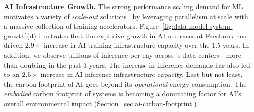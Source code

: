 \textbf{AI Infrastructure Growth.}
The strong performance scaling demand for ML motivates a variety of \textit{scale-out} solutions~\cite{Mudigere:scaling-training:2021,Rajbhandari:zero:2021} by leveraging parallelism at scale with a massive collection of training accelerators.
Figure~\ref{fig:data-model-system-growth}(d) illustrates that the explosive growth in AI use cases at Facebook has driven $2.9\times$ increase in AI training infrastructure capacity over the 1.5 years.
In addition, we observe trillions of inference per day across \fb's data centers---more than doubling in the past 3 years. 
The increase in inference demands has also led to an $2.5\times$ increase in AI inference infrastructure capacity. 
Last but not least, the carbon footprint of AI goes beyond its \textit{operational} energy consumption. 
The \textit{embodied} carbon footprint of systems is becoming a dominating factor for AI's overall environmental impact (Section~\ref{sec:ai-carbon-footprint})~\cite{Gupta:HPCA:2021}.


